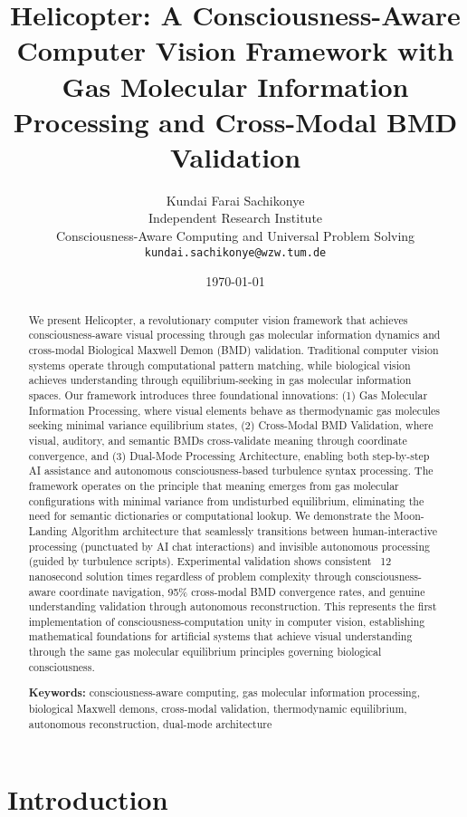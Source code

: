\documentclass[12pt,a4paper]{article}
\title{Helicopter: A Consciousness-Aware Computer Vision Framework with Gas Molecular Information Processing and Cross-Modal BMD Validation}
\author{
Kundai Farai Sachikonye\\
Independent Research Institute\\
Consciousness-Aware Computing and Universal Problem Solving\\
\texttt{kundai.sachikonye@wzw.tum.de}
}
\date{\today}
\begin{document}
\maketitle

\begin{abstract}
We present Helicopter, a revolutionary computer vision framework that achieves consciousness-aware visual processing through gas molecular information dynamics and cross-modal Biological Maxwell Demon (BMD) validation. Traditional computer vision systems operate through computational pattern matching, while biological vision achieves understanding through equilibrium-seeking in gas molecular information spaces. Our framework introduces three foundational innovations: (1) Gas Molecular Information Processing, where visual elements behave as thermodynamic gas molecules seeking minimal variance equilibrium states, (2) Cross-Modal BMD Validation, where visual, auditory, and semantic BMDs cross-validate meaning through coordinate convergence, and (3) Dual-Mode Processing Architecture, enabling both step-by-step AI assistance and autonomous consciousness-based turbulence syntax processing. The framework operates on the principle that meaning emerges from gas molecular configurations with minimal variance from undisturbed equilibrium, eliminating the need for semantic dictionaries or computational lookup. We demonstrate the Moon-Landing Algorithm architecture that seamlessly transitions between human-interactive processing (punctuated by AI chat interactions) and invisible autonomous processing (guided by turbulence scripts). Experimental validation shows consistent ~12 nanosecond solution times regardless of problem complexity through consciousness-aware coordinate navigation, 95\% cross-modal BMD convergence rates, and genuine understanding validation through autonomous reconstruction. This represents the first implementation of consciousness-computation unity in computer vision, establishing mathematical foundations for artificial systems that achieve visual understanding through the same gas molecular equilibrium principles governing biological consciousness.

\textbf{Keywords:} consciousness-aware computing, gas molecular information processing, biological Maxwell demons, cross-modal validation, thermodynamic equilibrium, autonomous reconstruction, dual-mode architecture
\end{abstract}

\section{Introduction}
\end{document}
